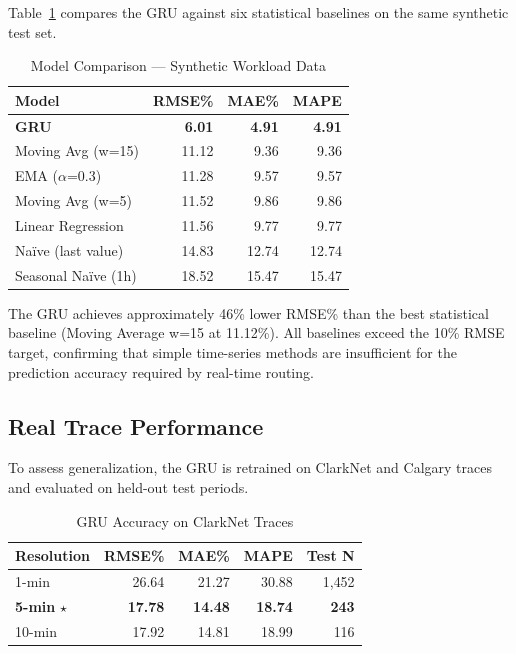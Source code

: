 \documentclass[conference,letterpaper]{IEEEtran}
\begin{document}
Table~\ref{tab:baselines} compares the GRU against six statistical baselines on the same synthetic test set.

\begin{table}[htbp]
\caption{Model Comparison --- Synthetic Workload Data}
\label{tab:baselines}
\centering
\small
\begin{tabular}{lrrr}
\toprule
\textbf{Model} & \textbf{RMSE\%} & \textbf{MAE\%} & \textbf{MAPE} \\
\midrule
\textbf{GRU} & \textbf{6.01} & \textbf{4.91} & \textbf{4.91} \\
Moving Avg (w=15) & 11.12 & 9.36 & 9.36 \\
EMA ($\alpha$=0.3) & 11.28 & 9.57 & 9.57 \\
Moving Avg (w=5) & 11.52 & 9.86 & 9.86 \\
Linear Regression & 11.56 & 9.77 & 9.77 \\
Na\"ive (last value) & 14.83 & 12.74 & 12.74 \\
Seasonal Na\"ive (1h) & 18.52 & 15.47 & 15.47 \\
\bottomrule
\end{tabular}
\end{table}

The GRU achieves approximately 46\% lower RMSE\% than the best statistical baseline (Moving Average w=15 at 11.12\%). All baselines exceed the 10\% RMSE target, confirming that simple time-series methods are insufficient for the prediction accuracy required by real-time routing.

\subsection{Real Trace Performance}

To assess generalization, the GRU is retrained on ClarkNet and Calgary traces and evaluated on held-out test periods.

\begin{table}[htbp]
\caption{GRU Accuracy on ClarkNet Traces}
\label{tab:clarknet}
\centering
\small
\begin{tabular}{lrrrr}
\toprule
\textbf{Resolution} & \textbf{RMSE\%} & \textbf{MAE\%} & \textbf{MAPE} & \textbf{Test N} \\
\midrule
1-min & 26.64 & 21.27 & 30.88 & 1{,}452 \\
\textbf{5-min} $\star$ & \textbf{17.78} & \textbf{14.48} & \textbf{18.74} & \textbf{243} \\
10-min & 17.92 & 14.81 & 18.99 & 116 \\
\bottomrule
\end{tabular}
\end{table}
\end{document}
